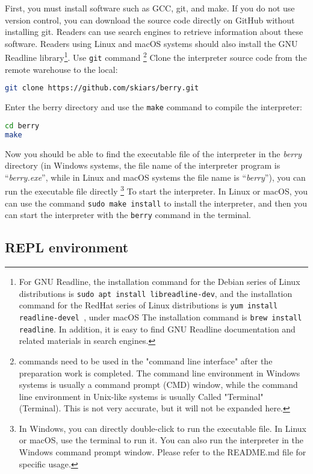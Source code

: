 First, you must install software such as GCC, git, and make. If you do not use version control, you can download the source code directly on GitHub without installing git. Readers can use search engines to retrieve information about these software. Readers using Linux and macOS systems should also install the GNU Readline library\footnote{For GNU Readline, the installation command for the Debian series of Linux distributions is \texttt{sudo apt install libreadline-dev}, and the installation command for the RedHat series of Linux distributions is \texttt{yum install readline-devel }, under macOS The installation command is \texttt{brew install readline}. In addition, it is easy to find GNU Readline documentation and related materials in search engines. }. Use \texttt{git} command \footnote {commands need to be used in the "command line interface" after the preparation work is completed. The command line environment in Windows systems is usually a command prompt (CMD) window, while the command line environment in Unix-like systems is usually Called "Terminal" (Terminal). This is not very accurate, but it will not be expanded here. } Clone the interpreter source code from the remote warehouse to the local:
\begin{lstlisting}[language=bash, numbers=none]
git clone https://github.com/skiars/berry.git
\end{lstlisting}
Enter the berry directory and use the \texttt{make} command to compile the interpreter:
\begin{lstlisting}[language=bash, numbers=none]
cd berry
make
\end{lstlisting}

Now you should be able to find the executable file of the interpreter in the \textsl{berry} directory (in Windows systems, the file name of the interpreter program is ``\textsl{berry.exe}'', while in Linux and macOS systems the file name is ``\textsl{berry}''), you can run the executable file directly \footnote{In Windows, you can directly double-click to run the executable file. In Linux or macOS, use the terminal to run it. You can also run the interpreter in the Windows command prompt window. Please refer to the README.md file for specific usage. } To start the interpreter. In Linux or macOS, you can use the command \texttt{sudo make install} to install the interpreter, and then you can start the interpreter with the \texttt{berry} command in the terminal.

\subsection {REPL environment}

